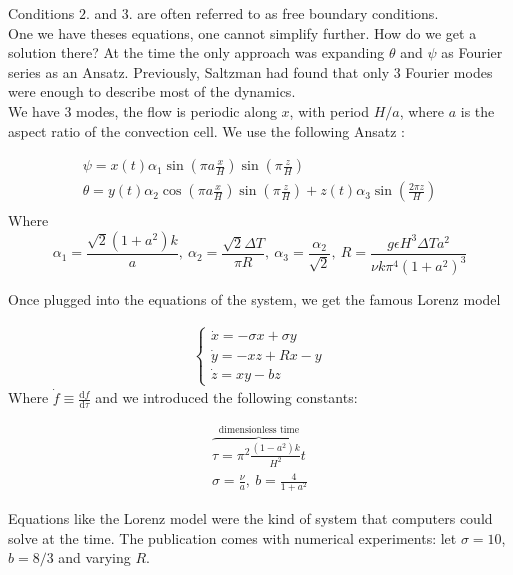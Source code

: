 Conditions $2.$ and $3.$ are often referred to as free boundary conditions. \\

One we have theses equations, one cannot simplify further. How do we get a solution there? At the time the only approach was expanding $\theta$ and $\psi$ as Fourier series as an Ansatz. Previously, Saltzman had found that only $3$ Fourier modes were enough to describe most of the dynamics. \\

We have $3$ modes, the flow is periodic along $x$, with period $H/a$, where $a$ is the aspect ratio of the convection cell. We use the following Ansatz :

\begin{align*}
    \psi = x(t) \alpha_1 \sin\left( \pi a \frac{x}{H} \right) \sin\left( \pi \frac{z}{H} \right) \\
    \theta = y(t) \alpha_2 \cos\left( \pi a \frac{x}{H} \right) \sin\left( \pi \frac{z}{H} \right) + z(t) \alpha_3 \sin\left(\frac{2 \pi z}{H}\right) \\
    \end{align*}
Where
\begin{equation*}
    \alpha_1 = \frac{\sqrt{2} (1+a^2) k }{a},~
    \alpha_2 = \frac{\sqrt{2} \Delta T }{\pi R},~ 
    \alpha_3 = \frac{\alpha_2}{\sqrt{2}},~
    R = \frac{g \epsilon H^3 \Delta T a^2}{\nu k \pi^4 (1+a^2)^3}
\end{equation*}

Once plugged into the equations of the system, we get the famous Lorenz model

\begin{align*}
    \begin{cases}
        \dot{x} = - \sigma x + \sigma y \\
        \dot{y} = - xz + Rx - y \\
        \dot{z} = xy - bz 
    \end{cases}
\end{align*}
Where $\dot{f} \equiv \frac{\mathrm{d}f}{\mathrm{d}\tau}$
and we introduced the following constants:

\begin{align*}
    \overbrace{\tau = \pi^2 \frac{(1-a^2)k}{H^2} t}^\text{dimensionless time} \\
    \sigma = \frac{\nu}{a}, ~ b = \frac{4}{1 + a^2}
\end{align*}

Equations like the Lorenz model were the kind of system that computers could solve at the time. The publication comes with numerical experiments: let $\sigma=10$, $b=8/3$ and varying $R$.

